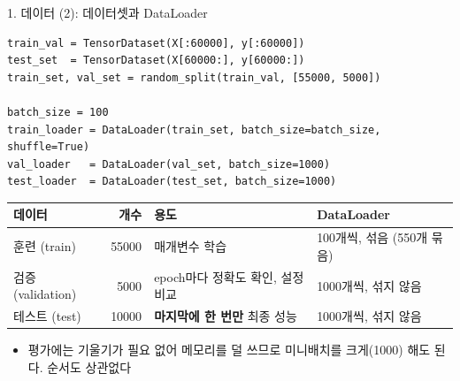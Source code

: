 \documentclass[aspectratio=169,11pt]{beamer}
\begin{document}
\begin{frame}[fragile]{1. 데이터 (2): 데이터셋과 DataLoader}
\begin{lstlisting}
train_val = TensorDataset(X[:60000], y[:60000])
test_set  = TensorDataset(X[60000:], y[60000:])
train_set, val_set = random_split(train_val, [55000, 5000])

batch_size = 100
train_loader = DataLoader(train_set, batch_size=batch_size, shuffle=True)
val_loader   = DataLoader(val_set, batch_size=1000)
test_loader  = DataLoader(test_set, batch_size=1000)
\end{lstlisting}
\vskip1mm
\centering
\footnotesize
\begin{tabular}{lrll}
\toprule
\textbf{데이터} & \textbf{개수} & \textbf{용도} & \textbf{DataLoader} \\
\midrule
훈련 (train) & 55000 & 매개변수 학습 & 100개씩, 섞음 (550개 묶음) \\
검증 (validation) & 5000 & epoch마다 정확도 확인, 설정 비교 & 1000개씩, 섞지 않음 \\
테스트 (test) & 10000 & \textbf{마지막에 한 번만} 최종 성능 & 1000개씩, 섞지 않음 \\
\bottomrule
\end{tabular}
\vskip2mm
\raggedright
\begin{itemize}
\item 평가에는 기울기가 필요 없어 메모리를 덜 쓰므로 미니배치를 크게(1000) 해도 된다. 순서도 상관없다
\end{itemize}
\end{frame}
\end{document}
